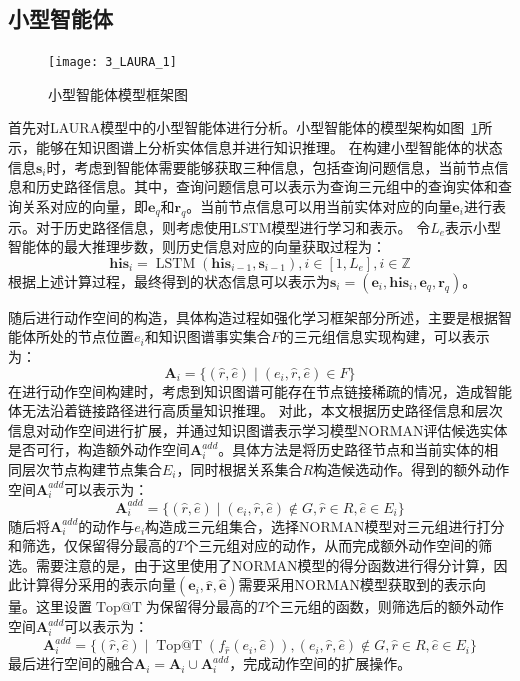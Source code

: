 \documentclass[algorithmlist, AutoFakeBold, AutoFakeSlant, figurelist, tablelist, nomlist, engineering, openany]{seuthesix} %
\begin{document}
\subsection{小型智能体}
\begin{figure}
  \centering
  \texttt{[image: 3\_LAURA\_1]}
  \caption{小型智能体模型框架图}
  \label{3_LAURA_1}
\end{figure}
首先对LAURA模型中的小型智能体进行分析。小型智能体的模型架构如图~\ref{3_LAURA_1}所示，能够在知识图谱上分析实体信息并进行知识推理。
在构建小型智能体的状态信息$\bm{s}_i$时，考虑到智能体需要能够获取三种信息，包括查询问题信息，当前节点信息和历史路径信息。其中，查询问题信息可以表示为查询三元组中的查询实体和查询关系对应的向量，即$\bm{e}_q$和$\bm{r}_q$。当前节点信息可以用当前实体对应的向量$\bm{e}_i$进行表示。对于历史路径信息，则考虑使用LSTM模型进行学习和表示。
令$L_e$表示小型智能体的最大推理步数，则历史信息对应的向量获取过程为：
\begin{equation}
  \bm{his}_i=\operatorname{LSTM}\left(\bm{his}_{i - 1}, \bm{s}_{i - 1}\right), i \in [1, L_e], i \in \mathbb{Z}
  \label{equation_HistoryLSTM}
\end{equation}
根据上述计算过程，最终得到的状态信息可以表示为$\bm{s}_i = (\bm{e}_i, \bm{his}_i, \bm{e}_q, \bm{r}_q)$。

随后进行动作空间的构造，具体构造过程如强化学习框架部分所述，主要是根据智能体所处的节点位置$e_i$和知识图谱事实集合$F$的三元组信息实现构建，可以表示为：
\begin{equation}
  \bm{A}_i = \{(\hat{r}, \hat{e}) \mid (e_i, \hat{r}, \hat{e}) \in F\}
  \label{base_1}
\end{equation}
在进行动作空间构建时，考虑到知识图谱可能存在节点链接稀疏的情况，造成智能体无法沿着链接路径进行高质量知识推理。
对此，本文根据历史路径信息和层次信息对动作空间进行扩展，并通过知识图谱表示学习模型NORMAN评估候选实体是否可行，构造额外动作空间$\bm{A}_{i}^{add}$。具体方法是将历史路径节点和当前实体的相同层次节点构建节点集合$E_i$，同时根据关系集合$R$构造候选动作。得到的额外动作空间$\bm{A}_{i}^{add}$可以表示为：
\begin{equation}
  \bm{A}_{i}^{add} = \{(\hat{r}, \hat{e}) \mid (e_i, \hat{r}, \hat{e}) \notin G, \hat{r} \in R, \hat{e} \in E_i \}
  \label{extra_1}
\end{equation}
随后将$\bm{A}_{i}^{add}$的动作与$e_i$构造成三元组集合，选择NORMAN模型对三元组进行打分和筛选，仅保留得分最高的$T$个三元组对应的动作，从而完成额外动作空间的筛选。需要注意的是，由于这里使用了NORMAN模型的得分函数进行得分计算，因此计算得分采用的表示向量$(\bm{e}_i, \bm{\hat{r}}, \bm{\hat{e}})$需要采用NORMAN模型获取到的表示向量。这里设置$\operatorname{Top@T}$为保留得分最高的$T$个三元组的函数，则筛选后的额外动作空间$\bm{A}_{i}^{add}$可以表示为：
\begin{equation}
  \bm{A}_i^{add} = \{(\hat{r}, \hat{e}) \mid \operatorname{Top@T}(f_{\hat{r}}(e_i, \hat{e})), (e_i, \hat{r}, \hat{e}) \notin G, \hat{r} \in R, \hat{e} \in E_i \}
\end{equation}
最后进行空间的融合$\bm{A}_i = \bm{A}_i \cup \bm{A}_{i}^{add} $，完成动作空间的扩展操作。
\end{document}
